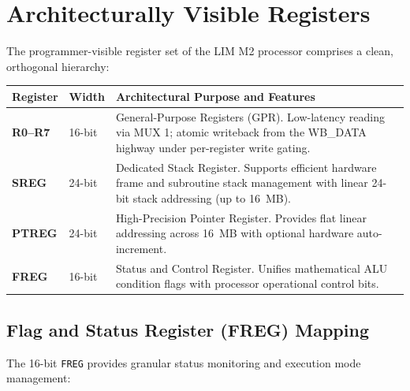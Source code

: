 \documentclass[11pt,a4paper]{article}
\newcommand{\reg}[1]{\texttt{#1}}
\begin{document}
\section{Architecturally Visible Registers}
The programmer-visible register set of the LIM M2 processor comprises a clean, orthogonal hierarchy:

\begin{longtable}{>{\ttfamily\bfseries}p{25mm}p{28mm}p{93mm}}
\toprule
Register & Width & Architectural Purpose and Features \\
\midrule\endhead
R0--R7 & 16-bit & General-Purpose Registers (GPR). Low-latency reading via MUX 1; atomic writeback from the WB\_DATA highway under per-register write gating. \\
SREG & 24-bit & Dedicated Stack Register. Supports efficient hardware frame and subroutine stack management with linear 24-bit stack addressing (up to 16~MB). \\
PTREG & 24-bit & High-Precision Pointer Register. Provides flat linear addressing across 16~MB with optional hardware auto-increment. \\
FREG & 16-bit & Status and Control Register. Unifies mathematical ALU condition flags with processor operational control bits. \\
\bottomrule
\end{longtable}

\subsection{Flag and Status Register (FREG) Mapping}
The 16-bit \reg{FREG} provides granular status monitoring and execution mode management:
\end{document}
